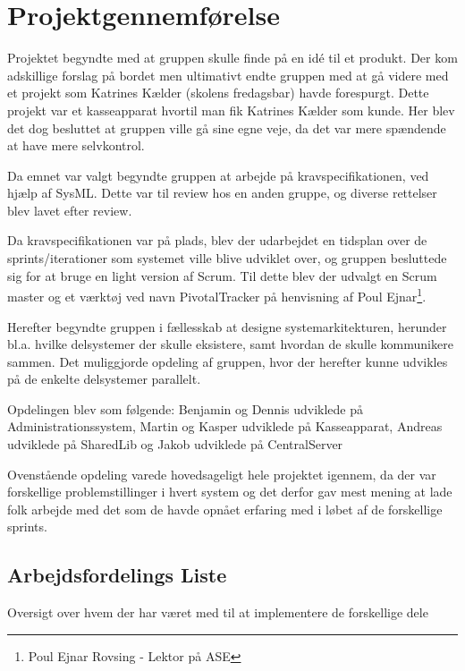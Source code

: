\section{Projektgennemførelse}
Projektet begyndte med at gruppen skulle finde på en idé til et produkt. Der kom adskillige forslag på bordet men ultimativt endte gruppen med at gå videre med et projekt som Katrines Kælder (skolens fredagsbar) havde forespurgt. Dette projekt var et kasseapparat hvortil man fik Katrines Kælder som kunde. Her blev det dog besluttet at gruppen ville gå sine egne veje, da det var mere spændende at have mere selvkontrol.

Da emnet var valgt begyndte gruppen at arbejde på kravspecifikationen, ved hjælp af SysML. Dette var til review hos en anden gruppe, og diverse rettelser blev lavet efter review.

Da kravspecifikationen var på plads, blev der udarbejdet en tidsplan over de sprints/iterationer som systemet ville blive udviklet over, og gruppen besluttede sig for at bruge en light version af Scrum. Til dette blev der udvalgt en Scrum master og et værktøj ved navn PivotalTracker på henvisning af Poul Ejnar\footnote{Poul Ejnar Rovsing - Lektor på ASE}.

Herefter begyndte gruppen i fællesskab at designe systemarkitekturen, herunder bl.a. hvilke delsystemer der skulle eksistere, samt hvordan de skulle kommunikere sammen. Det muliggjorde opdeling af gruppen, hvor der herefter kunne udvikles på de enkelte delsystemer parallelt.

Opdelingen blev som følgende: Benjamin og Dennis udviklede på Administrationssystem, Martin og Kasper udviklede på Kasseapparat, Andreas udviklede på SharedLib og Jakob udviklede på CentralServer

Ovenstående opdeling varede hovedsageligt hele projektet igennem, da der var forskellige problemstillinger i hvert system og det derfor gav mest mening at lade folk arbejde med det som de havde opnået erfaring med i løbet af de forskellige sprints.
\newpage
\subsection{Arbejdsfordelings Liste}

Oversigt over hvem der har været med til at implementere de forskellige dele

